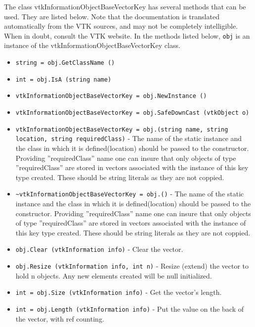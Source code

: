 The class vtkInformationObjectBaseVectorKey has several methods that can be used.
  They are listed below.
Note that the documentation is translated automatically from the VTK sources,
and may not be completely intelligible.  When in doubt, consult the VTK website.
In the methods listed below, \verb|obj| is an instance of the vtkInformationObjectBaseVectorKey class.
\begin{itemize}
\item  \verb|string = obj.GetClassName ()|

\item  \verb|int = obj.IsA (string name)|

\item  \verb|vtkInformationObjectBaseVectorKey = obj.NewInstance ()|

\item  \verb|vtkInformationObjectBaseVectorKey = obj.SafeDownCast (vtkObject o)|

\item  \verb|vtkInformationObjectBaseVectorKey = obj.(string name, string location, string requiredClass)| -  The name of the static instance and the class in which
 it is defined(location) should be passed to the constructor.
 Providing ''requiredClass'' name one can insure that only 
 objects of type ''requiredClass'' are stored in vectors 
 associated with the instance of this key type created.
 These should be string literals as they are not coppied.

\item  \verb|~vtkInformationObjectBaseVectorKey = obj.()| -  The name of the static instance and the class in which
 it is defined(location) should be passed to the constructor.
 Providing ''requiredClass'' name one can insure that only 
 objects of type ''requiredClass'' are stored in vectors 
 associated with the instance of this key type created.
 These should be string literals as they are not coppied.


\item  \verb|obj.Clear (vtkInformation info)| -  Clear the vector.

\item  \verb|obj.Resize (vtkInformation info, int n)| -  Resize (extend) the vector to hold n objects. Any new elements
 created will be null initialized.

\item  \verb|int = obj.Size (vtkInformation info)| -  Get the vector's length.

\item  \verb|int = obj.Length (vtkInformation info)| -  Put the value on the back of the vector, with ref counting.


\end{itemize}

